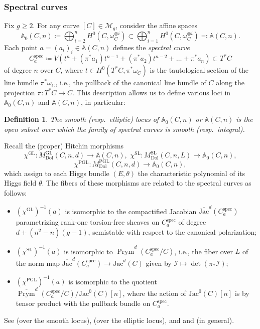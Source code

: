\documentclass[11pt,reqno]{amsart}
\theoremstyle{plain} %
\newtheorem{definition}[theorem]{Definition}
\theoremstyle{definition}
\newcommand{\M}{\mathcal{M}}
\DeclareMathOperator{\GL}{GL}
\DeclareMathOperator{\SL}{SL}
\DeclareMathOperator{\PGL}{PGL}
\newcommand{\Dol}{\mathrm{Dol}}
\newcommand{\Jac}{\mathrm{Jac}}
\renewcommand{\AA}{\mathbb{A}}
\DeclareMathOperator{\Prym}{Prym}
\DeclareMathOperator{\spec}{spec}
\begin{document}
\subsubsection{Spectral curves}
Fix $g\geq 2$. For any curve $[C] \in \M_g$, consider the affine spaces
$$\AA_0(C,n) \coloneqq \bigoplus_{i=2}^n H^0(C, \omega_C^{\otimes i}) \subset \bigoplus_{i=1}^n H^0(C, \omega_C^{\otimes i}) \eqqcolon \AA(C,n).$$
Each point $a = (a_i)_i \in \AA(C,n)$ defines the \textit{spectral curve} \[C^{\spec}_a \coloneqq V(t^n + (\pi^* a_1)t^{n-1}+ (\pi^* a_2) t^{n-2} + \ldots + \pi^* a_n) \subset T^*C\] of degree $n$ over $C$, where $t \in H^0(T^*C, \pi^* \omega_C)$ is the tautological section of the line bundle $\pi^* \omega_C$, i.e., the pullback of the canonical line bundle of $C$ along the projection $\pi \colon T^*C \to C$. This description allows us to define various loci in $\AA_0(C,n)$ and $\AA(C,n)$, in particular:

\begin{definition}
    The smooth (resp.\ elliptic) locus of $\AA_0(C,n)$ or $\AA(C,n)$ is the open subset over which the family of spectral curves is smooth (resp.\ integral).
\end{definition}

Recall the (proper) Hitchin morphisms
$$\chi^{\GL}\colon M^{\GL}_{\Dol}(C,n,d) \to \AA(C,n), \,\, \chi^{\SL}\colon M^{\SL}_{\Dol}(C,n,L) \to \AA_0(C,n),$$
$$\chi^{\PGL}\colon M^{\PGL}_{\Dol}(C,n,d) \to \AA_0(C,n),$$
which assign to each Higgs bundle $(E, \theta)$ the characteristic polynomial of its Higgs field $\theta$. %
The fibers of these morphisms are related to the spectral curves as follows:
\begin{itemize}
    \item $(\chi^{\GL})^{-1}(a)$ is isomorphic to the compactified Jacobian $\overline{\Jac}^d(C^{\spec}_a)$ parametrizing rank-one torsion-free sheaves on $C^{\spec}_a$ of degree $d+(n^2-n)(g-1)$, semistable with respect to the canonical polarization;
    \item $(\chi^{\SL})^{-1}(a)$ is isomorphic to $\overline{\Prym}^d(C^{\spec}_a/C)$, i.e., the fiber over $L$ of the norm map $
    \overline{\Jac}^d(C^{\spec}_a) 
    \to \Jac^d(C)$ given by $\mathcal I \mapsto \det(\pi_* \mathcal I)$;
    \item $(\chi^{\PGL})^{-1}(a)$ is isomorphic to the quotient $\overline{\Prym}^d(C^{\spec}_a/C)/\Jac^0(C)[n]$, where the action of $\Jac^0(C)[n]$ is by tensor product with the pullback bundle on $C_a^{\spec}$.
\end{itemize}
See \cite[\S 5.1]{Hitchin-stable} (over the smooth locus), \cite[Proposition 3.4]{BNR} (over the elliptic locus), and \cite{Schaub} and \cite[Proposition 6.1]{Hausel-Pauly} (in general).
\end{document}
